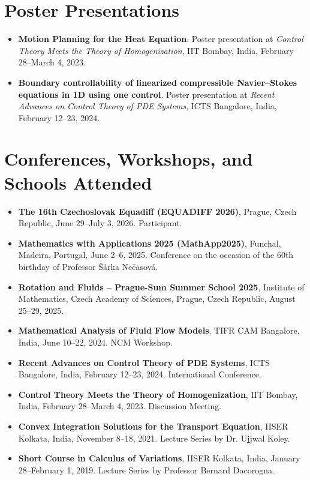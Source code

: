 \documentclass[10pt,a4paper]{article}
\begin{document}
\section*{Poster Presentations}
\begin{itemize}
    \item \textbf{Motion Planning for the Heat Equation}. Poster presentation at \emph{Control Theory Meets the Theory of Homogenization}, IIT Bombay, India, February 28--March 4, 2023.
    \item \textbf{Boundary controllability of linearized compressible Navier--Stokes equations in 1D using one control}. Poster presentation at \emph{Recent Advances on Control Theory of PDE Systems}, ICTS Bangalore, India, February 12--23, 2024.
\end{itemize}

\section*{Conferences, Workshops, and Schools Attended}
\begin{itemize}
    \item \textbf{The 16th Czechoslovak Equadiff (EQUADIFF 2026)}, Prague, Czech Republic, June 29--July 3, 2026. Participant.
    \item \textbf{Mathematics with Applications 2025 (MathApp2025)}, Funchal, Madeira, Portugal, June 2--6, 2025. Conference on the occasion of the 60th birthday of Professor \v{S}\'arka Ne\v{c}asov\'a.
    \item \textbf{Rotation and Fluids -- Prague-Sum Summer School 2025}, Institute of Mathematics, Czech Academy of Sciences, Prague, Czech Republic, August 25--29, 2025.
    \item \textbf{Mathematical Analysis of Fluid Flow Models}, TIFR CAM Bangalore, India, June 10--22, 2024. NCM Workshop.
    \item \textbf{Recent Advances on Control Theory of PDE Systems}, ICTS Bangalore, India, February 12--23, 2024. International Conference.
    \item \textbf{Control Theory Meets the Theory of Homogenization}, IIT Bombay, India, February 28--March 4, 2023. Discussion Meeting.
    \item \textbf{Convex Integration Solutions for the Transport Equation}, IISER Kolkata, India, November 8--18, 2021. Lecture Series by Dr. Ujjwal Koley.
    \item \textbf{Short Course in Calculus of Variations}, IISER Kolkata, India, January 28--February 1, 2019. Lecture Series by Professor Bernard Dacorogna.
\end{itemize}
\end{document}
